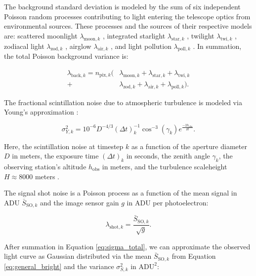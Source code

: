 \documentclass[a4paper,twocolumn]{spaceDebrisC} %
\begin{document}
The background standard deviation is modeled by the sum of six independent Poisson random processes contributing to light entering the telescope optics from environmental sources. These processes and the sources of their respective models are: scattered moonlight $\lambda_{\text{moon},k}$ \cite{daniels1977}, integrated starlight $\lambda_{\text{star},k}$ \cite{krag2003}, twilight $\lambda_{\text{twi},k}$ \cite{patat2006}, zodiacal light $\lambda_{\text{zod},k}$ \cite{roach1972}, airglow $\lambda_{\text{air},k}$ \cite{krag2003}, and light pollution $\lambda_{\text{poll},k}$ \cite{falchi2016, falchi2016_data}. In summation, the total Poisson background variance is:

\begin{equation}
  \begin{split}
  \lambda_{\text{back},k} = n_{\text{pix},k} ( &\lambda_{\text{moon},k} + \lambda_{\text{star},k} + \lambda_{\text{twi},k} \\+ &\lambda_{\text{zod},k} + \lambda_{\text{air},k} + \lambda_{\text{poll},k} ).
  \end{split}
\end{equation}

The fractional scintillation noise due to atmospheric turbulence is modeled via Young's approximation \cite{osborn2015}:

\begin{equation} \label{eq:scint_noise}
  \sigma^2_{Y,k} = 10^{-6} D^{-4/3} (\Delta t)_k^{-1} \cos^{-3}\left(\gamma_k\right) e^{\frac{-2h_\text{obs}}{H}}.
\end{equation}

Here, the scintillation noise at timestep $k$ as a function of the aperture diameter $D$ in meters, the exposure time $(\Delta t)_k$ in seconds, the zenith angle $\gamma_k$, the observing station's altitude $h_\text{obs}$ in meters, and the turbulence scaleheight $H\approx8000$ meters \cite{osborn2015}.

The signal shot noise is a Poisson process as a function of the mean signal in ADU $\bar{S}_{\text{SO},k}$ and the image sensor gain $g$ in ADU per photoelectron:

\begin{equation}
  \lambda_{\text{shot},k} = \frac{\bar{S}_{\text{SO},k}}{\sqrt{g}}.
\end{equation}

After summation in Equation \ref{eq:sigma_total}, we can approximate the observed light curve as Gaussian distributed via the mean $\bar{S}_{\text{SO},k}$ from Equation \ref{eq:general_bright} and the variance $\sigma^2_{S,k}$ in $\text{ADU}^2$:
\end{document}
